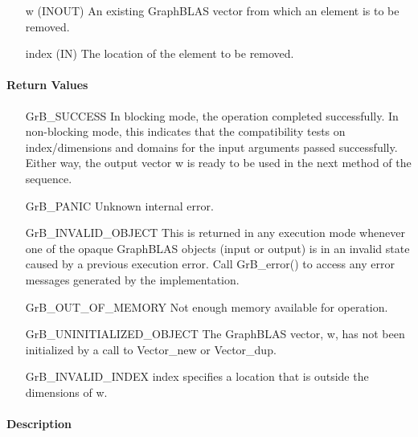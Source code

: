 \begin{itemize}[leftmargin=1.1in]
    \item[{\sf w}]   ({\sf INOUT}) An existing GraphBLAS vector from which an 
    element is to be removed.

    \item[{\sf index}] ({\sf IN}) The location of the element to be removed.
\end{itemize}

\paragraph{Return Values}

\begin{itemize}[leftmargin=2.1in]
    \item[{\sf GrB\_SUCCESS}]         In blocking mode, the operation completed
    successfully. In non-blocking mode, this indicates that the compatibility 
    tests on index/dimensions and domains for the input arguments passed successfully. 
    Either way, the output vector {\sf w} is ready to be used in the next method of 
    the sequence.

    \item[{\sf GrB\_PANIC}]   Unknown internal error.
    
    \item[{\sf GrB\_INVALID\_OBJECT}] This is returned in any execution mode 
    whenever one of the opaque GraphBLAS objects (input or output) is in an invalid 
    state caused by a previous execution error.  Call {\sf GrB\_error()} to access 
    any error messages generated by the implementation.

    \item[{\sf GrB\_OUT\_OF\_MEMORY}]  Not enough memory available for operation.
    
    \item[{\sf GrB\_UNINITIALIZED\_OBJECT}]  The GraphBLAS vector, {\sf w}, has 
    not been initialized by a call to {\sf Vector\_new} or {\sf Vector\_dup}.
    
    \item[{\sf GrB\_INVALID\_INDEX}]  {\sf index} specifies a location 
    that is outside the dimensions of {\sf w}.
\end{itemize}

\paragraph{Description}

